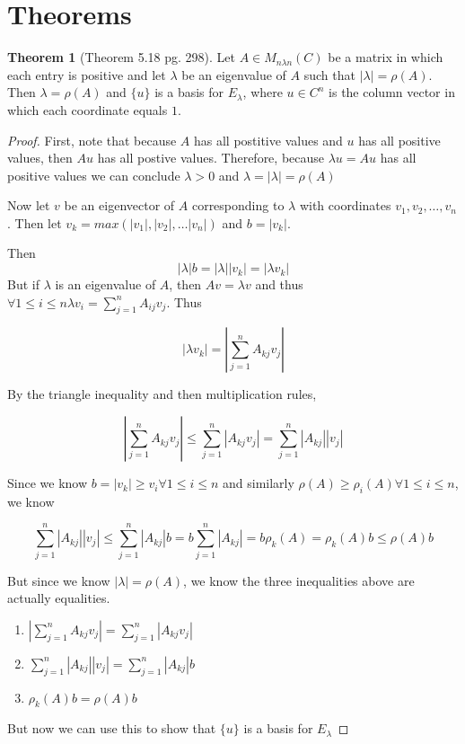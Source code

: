 \documentclass{amsart}
\theoremstyle{definition}
\newtheorem{theorem}{Theorem}
\theoremstyle{remark}
\numberwithin{equation}{section}
\begin{document}
\section{Theorems}

\begin{theorem}[Theorem 5.18 pg. 298]
Let $A \in M_{n \lambda n} (C)$ be a matrix in which each entry is positive and let $\lambda$ be an eigenvalue of $A$ such that $| \lambda | = \rho(A)$.
Then $\lambda = \rho(A)$ and $\{ u \}$ is a basis for $E_{\lambda}$, where $u \in C^n$ is the column vector in which each coordinate equals $1$.

\end{theorem}

\begin{proof}
First, note that because $A$ has all postitive values and $u$ has all positive values, then $Au$ has all postive values. Therefore, because $\lambda u = Au$ has all positive values we can conclude $\lambda > 0$ and $\lambda = |\lambda| = \rho(A)$


Now let $v$ be an eigenvector of $A$ corresponding to $\lambda$ with coordinates $v_1, v_2, \ldots, v_n$.  
Then let $v_k = max(|v_1|, |v_2|, \ldots |v_n|)$ and $b = |v_k|$.

Then $$ |\lambda| b = |\lambda| |v_k| = |\lambda v_k| $$
But if $\lambda$ is an eigenvalue of $A$, then $Av = \lambda v$ and thus $\forall 1 \leq i \leq n \lambda v_i = \sum_{j = 1}^n A_{ij}v_j$.
Thus

$$ |\lambda v_k| = | \sum_{j = 1}^n A_{kj}v_j | $$

By the triangle inequality and then multiplication rules,

$$ | \sum_{j = 1}^n A_{kj}v_j | \leq \sum_{j=1}^n |A_{kj}v_j| = \sum_{j=1}^n |A_{kj}| |v_j| $$

Since we know $b = |v_k| \geq v_i \forall 1 \leq i \leq n$ and similarly $\rho(A) \geq  \rho_i(A) \forall 1 \leq i \leq n $, we know 

$$ \sum_{j=1}^n |A_{kj}| |v_j|  \leq \sum_{j=1}^n |A_{kj}| b = b \sum_{j=1}^n |A_{kj}| =  b\rho_k(A) = \rho_k(A)b \leq \rho(A)b $$


But since we know $|\lambda| = \rho(A)$, we know the three inequalities above are actually equalities.

\begin{enumerate}

	\item $| \sum_{j = 1}^n A_{kj}v_j | = \sum_{j=1}^n |A_{kj}v_j|$

	\item $\sum_{j=1}^n |A_{kj}| |v_j|  = \sum_{j=1}^n |A_{kj}| b$

	\item $\rho_k(A)b = \rho(A)b$

\end{enumerate}


But now we can use this to show that $\{ u \}$ is a basis for $E_{\lambda}$



\end{proof}
\end{document}
